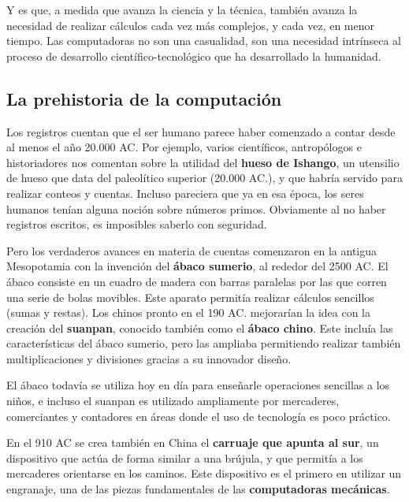 Y es que, a medida que avanza la ciencia y la técnica, también avanza la
necesidad de realizar cálculos cada vez más complejos, y cada vez, en menor
tiempo. Las computadoras no son una casualidad, son una necesidad intrínseca al
proceso de desarrollo científico-tecnológico que ha desarrollado la humanidad.

\subsection{La prehistoria de la computación}
\label{chap:historia_computadoras:subsec:prehistoria}

Los registros cuentan que el ser humano parece haber comenzado a contar desde al
menos el año 20.000 AC. Por ejemplo, varios científicos, antropólogos e
historiadores nos comentan sobre la utilidad del \textbf{hueso de Ishango}, un
utensilio de hueso que data del paleolítico superior (20.000 AC.), y que habría
servido para realizar conteos y cuentas. Incluso pareciera que ya en esa época,
los seres humanos tenían alguna noción sobre números primos. Obviamente al no
haber registros escritos, es imposibles saberlo con
seguridad.\autocite{bogoshi_1987}

 Pero los verdaderos avances en materia de
cuentas comenzaron en la antigua Mesopotamia con la invención del \textbf{ábaco
sumerio}, al rededor del 2500 AC. El ábaco consiste en un cuadro de madera con
barras paralelas por las que corren una serie de bolas movibles. Este aparato
permitía realizar cálculos sencillos (sumas y restas). Los chinos pronto en el
190 AC. mejorarían la idea con la creación del \textbf{suanpan}, conocido
también como el \textbf{ábaco chino}. Este incluía las características del ábaco
sumerio, pero las ampliaba permitiendo realizar también multiplicaciones y
divisiones gracias a su innovador diseño.
\autocite[vid.]{boyer_1991}

\begin{knowwhat}
    El ábaco todavía se utiliza hoy en día para enseñarle operaciones sencillas
    a los niños, e incluso el suanpan es utilizado ampliamente por mercaderes,
    comerciantes y contadores en áreas donde el uso de tecnología es poco
    práctico.
\end{knowwhat}

En el 910 AC se crea también en China el \textbf{carruaje que apunta al sur}, un
dispositivo que actúa de forma similar a una brújula, y que permitía a los
mercaderes orientarse en los caminos. Este dispositivo es el primero en utilizar
un engranaje, una de las piezas fundamentales de las \textbf{computadoras
mecánicas}.

